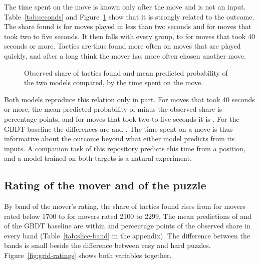 \documentclass[11pt]{article}
\begin{document}
The time spent on the move is known only after the move and is not an input.
Table~\ref{tab:seconds} and Figure~\ref{fig:seconds} show that it is strongly
related to the outcome. The share found is  for
moves played in less than two seconds and  for moves
that took two to five seconds. It then falls with every group, to
 for moves that took 40 seconds or more.
Tactics are thus found more often on moves that are played quickly, and after
a long think the mover has more often chosen another move.

\begin{table}[htbp]\centering\footnotesize
{}
\caption{Test-set results by the time spent on the move, in seconds. The
time spent is known only after the move and is not an input of any model.}
\label{tab:seconds}
\end{table}

\begin{figure}[htbp]\centering
{}
\caption{Observed share of tactics found and mean predicted probability of
the two models compared, by the time spent on the move.}
\label{fig:seconds}
\end{figure}

Both models reproduce this relation only in part. For moves that took 40
seconds or more, the mean predicted probability of  minus
the observed share is  percentage points,
and for moves that took two to five seconds it is
. For the GBDT baseline the differences
are  and
. The time spent on a move is thus
informative about the outcome beyond what either model predicts from its
inputs. A companion task of this repository predicts
this time from a position, and a model trained on both targets is a natural
experiment.

\subsection{Rating of the mover and of the puzzle}

By band of the mover's rating, the share of tactics found rises from
 for movers rated below 1700 to
 for movers rated 2100 to 2299. The mean
predictions of  and of the GBDT baseline are within
 and 
percentage points of the observed share in every band
(Table~\ref{tab:slice-band} in the appendix). The difference between the
bands is small beside the difference between easy and hard puzzles.
Figure~\ref{fig:grid-ratings} shows both variables together.
\end{document}
